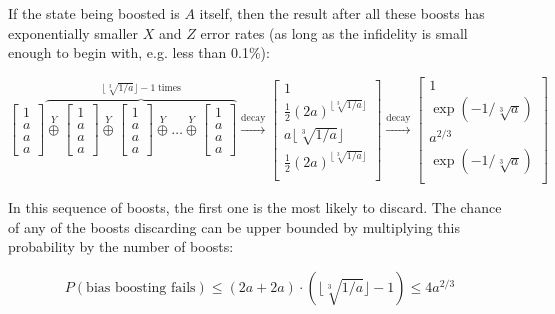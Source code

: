 \documentclass[onecolumn,unpublished,a4paper]{quantumarticle}
\theoremstyle{definition}
\theoremstyle{definition}
\theoremstyle{definition}
\begin{document}
If the state being boosted is $A$ itself, then the result after all these boosts has exponentially smaller $X$ and $Z$ error rates (as long as the infidelity is small enough to begin with, e.g. less than 0.1\%):

\begin{equation}
\begin{bmatrix}1\\a\\a\\a\end{bmatrix}
\overbrace{
\stackrel{Y}{\oplus}
\begin{bmatrix}1\\a\\a\\a\end{bmatrix}
\stackrel{Y}{\oplus}
\begin{bmatrix}1\\a\\a\\a\end{bmatrix}
\stackrel{Y}{\oplus}
\dots
\stackrel{Y}{\oplus}
\begin{bmatrix}1\\a\\a\\a\end{bmatrix}
}^{\lfloor \sqrt[3]{1/a} \rfloor - 1\;\text{times}}
\xrightarrow{\text{decay}}\begin{bmatrix}
1\\
\frac{1}{2}(2a)^{\lfloor \sqrt[3]{1/a} \rfloor}\\
a\lfloor \sqrt[3]{1/a} \rfloor\\
\frac{1}{2}(2a)^{\lfloor \sqrt[3]{1/a} \rfloor}\\
\end{bmatrix}
\xrightarrow{\text{decay}}\begin{bmatrix}
1\\
\exp(-1/\sqrt[3]{a})\\
a^{2/3}\\
\exp(-1/\sqrt[3]{a})\\
\end{bmatrix}
\end{equation}

In this sequence of boosts, the first one is the most likely to discard.
The chance of any of the boosts discarding can be upper bounded by multiplying this probability by the number of boosts:

\begin{equation}
P(\text{bias boosting fails}) \leq (2a+2a) \cdot (\lfloor \sqrt[3]{1/a} \rfloor-1) \leq 4 a^{2/3}
\end{equation}
\end{document}
